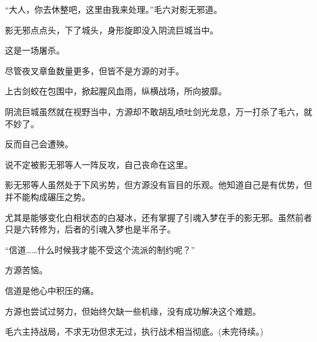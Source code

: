\begin{this_body}
“大人，你去休整吧，这里由我来处理。”毛六对影无邪道。

影无邪点点头，下了城头，身形旋即没入阴流巨城当中。

这是一场屠杀。

尽管夜叉章鱼数量更多，但皆不是方源的对手。

上古剑蛟在包围中，掀起腥风血雨，纵横战场，所向披靡。

阴流巨城虽然就在视野当中，方源却不敢胡乱喷吐剑光龙息，万一打杀了毛六，就不妙了。

反而自己会遭殃。

说不定被影无邪等人一阵反攻，自己丧命在这里。

影无邪等人虽然处于下风劣势，但方源没有盲目的乐观。他知道自己是有优势，但并不能构成碾压之势。

尤其是能够变化白相状态的白凝冰，还有掌握了引魂入梦在手的影无邪。虽然前者只是六转修为，后者的引魂入梦也是半吊子。

“信道……什么时候我才能不受这个流派的制约呢？”

方源苦恼。

信道是他心中积压的痛。

方源也尝试过努力，但始终欠缺一些机缘，没有成功解决这个难题。

毛六主持战局，不求无功但求无过，执行战术相当彻底。(未完待续。)

\end{this_body}

